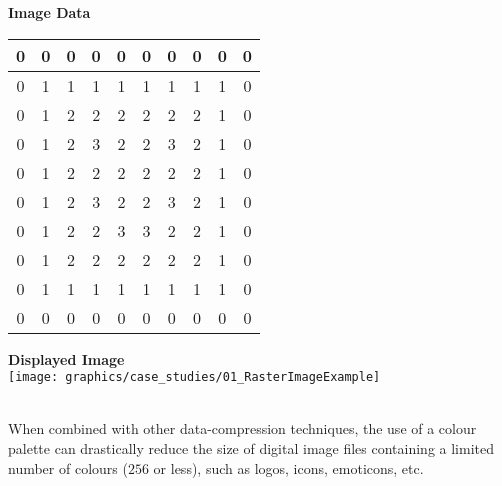       \begin{minipage}[t]{0.4\textwidth}
        \begin{center}
          \textbf{Image Data}
          \ \\[9pt]
          \renewcommand\arraystretch{1.475}
          \ttfamily\footnotesize
          \begin{tabular}{| c | c | c | c | c | c | c | c | c | c | }
            \hline
            0 & 0 & 0 & 0 & 0 & 0 & 0 & 0 & 0 & 0 \\
            \hline         
            0 & 1 & 1 & 1 & 1 & 1 & 1 & 1 & 1 & 0 \\
            \hline         
            0 & 1 & 2 & 2 & 2 & 2 & 2 & 2 & 1 & 0 \\
            \hline         
            0 & 1 & 2 & 3 & 2 & 2 & 3 & 2 & 1 & 0 \\
            \hline         
            0 & 1 & 2 & 2 & 2 & 2 & 2 & 2 & 1 & 0 \\
            \hline         
            0 & 1 & 2 & 3 & 2 & 2 & 3 & 2 & 1 & 0 \\
            \hline         
            0 & 1 & 2 & 2 & 3 & 3 & 2 & 2 & 1 & 0 \\
            \hline         
            0 & 1 & 2 & 2 & 2 & 2 & 2 & 2 & 1 & 0 \\
            \hline         
            0 & 1 & 1 & 1 & 1 & 1 & 1 & 1 & 1 & 0 \\
            \hline         
            0 & 0 & 0 & 0 & 0 & 0 & 0 & 0 & 0 & 0 \\         
            \hline         
          \end{tabular}
        \end{center}
      \end{minipage}
      \begin{minipage}[t]{0.4\textwidth}
        \begin{center}
          \textbf{Displayed Image}
          \ \\[9pt]
          \texttt{[image: graphics/case\_studies/01\_RasterImageExample]}
        \end{center}
      \end{minipage}
      \ \\[\baselineskip]
      When combined with other data-compression techniques, the use of a colour palette can drastically reduce the size of digital image files containing a limited number of colours ($256$ or less), such as logos, icons, emoticons, etc.
